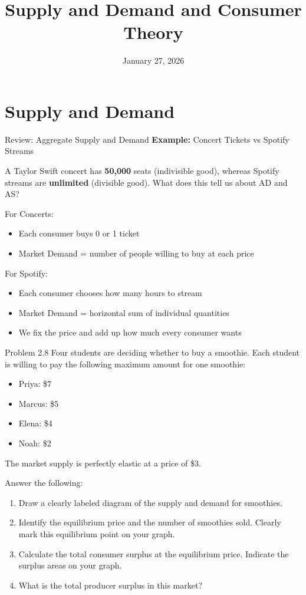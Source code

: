\documentclass{beamer}
\title[ECON 10000 TA Session 3]{Supply and Demand and Consumer Theory} %
\author{} %
\institute[UChicago Econ] %
{   \normalsize{\href{mailto:}{}}
}
\date{January 27, 2026} %
\theoremstyle{plain} %
\theoremstyle{definition} %
\begin{document}
\begin{frame}
	\titlepage %
\end{frame}

\section{Supply and Demand}

\begin{frame}{Review: Aggregate Supply and Demand}
    \textbf{Example:} Concert Tickets vs Spotify Streams

    A Taylor Swift concert has \textbf{50,000} seats (indivisible good), whereas Spotify streams are \textbf{unlimited} (divisible good). What does this tell us about AD and AS?

    For Concerts:
\begin{itemize}
    \item Each consumer buys 0 or 1 ticket
    \item Market Demand = number of people willing to buy at each price
\end{itemize}

    For Spotify:
\begin{itemize}
    \item Each consumer chooses how many hours to stream
    \item Market Demand = horizontal sum of individual quantities
    \item We fix the price and add up how much every consumer wants
\end{itemize}
\end{frame}


\begin{frame}{Problem 2.8}
    Four students are deciding whether to buy a smoothie. Each student is willing to pay the following maximum amount for one smoothie:

\begin{itemize}
    \item Priya: \$7
    \item Marcus: \$5
    \item Elena: \$4
    \item Noah: \$2
\end{itemize}

The market supply is perfectly elastic at a price of \$3. 

Answer the following:

\begin{enumerate}
    \item Draw a clearly labeled diagram of the supply and demand for smoothies.
    \item Identify the equilibrium price and the number of smoothies sold. Clearly mark this equilibrium point on your graph.
    \item Calculate the total consumer surplus at the equilibrium price. Indicate the surplus areas on your graph.
    \item What is the total producer surplus in this market? 
\end{enumerate}
\end{frame}
\end{document}
